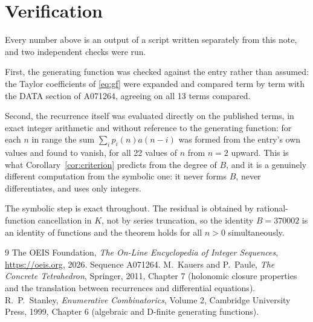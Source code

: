 \documentclass[11pt,a4paper]{article}
\theoremstyle{plain}
\theoremstyle{definition}
\begin{document}
\section{Verification}

Every number above is an output of a script written separately from this note, and two
independent checks were run.

First, the generating function was checked against the entry rather than assumed: the
Taylor coefficients of \eqref{eq:gf} were expanded and compared term by term with the DATA
section of A071264, agreeing on all 13 terms compared.

Second, the recurrence itself was evaluated directly on the published terms, in exact
integer arithmetic and without reference to the generating function: for each $n$ in range
the sum $\sum_{i}p_{i}(n)a(n-i)$ was formed from the entry's own values and found to
vanish, for all 22 values of $n$ from $n=2$ upward. This is what
Corollary~\ref{cor:criterion} predicts from the degree of $B$, and it is a genuinely
different computation from the symbolic one: it never forms $B$, never differentiates, and
uses only integers.

The symbolic step is exact throughout. The residual is obtained by rational-function
cancellation in $K$, not by series truncation, so the identity $B=370002$ is an
identity of functions and the theorem holds for all $n>0$ simultaneously.

\begin{thebibliography}{9}
 The OEIS Foundation, \emph{The On-Line Encyclopedia of Integer Sequences},
\url{https://oeis.org}, 2026. Sequence A071264.
 M.~Kauers and P.~Paule, \emph{The Concrete Tetrahedron}, Springer, 2011,
Chapter 7 (holonomic closure properties and the translation between recurrences and
differential equations).
 R.~P.~Stanley, \emph{Enumerative Combinatorics}, Volume 2, Cambridge
University Press, 1999, Chapter 6 (algebraic and D-finite generating functions).
\end{thebibliography}
\end{document}

